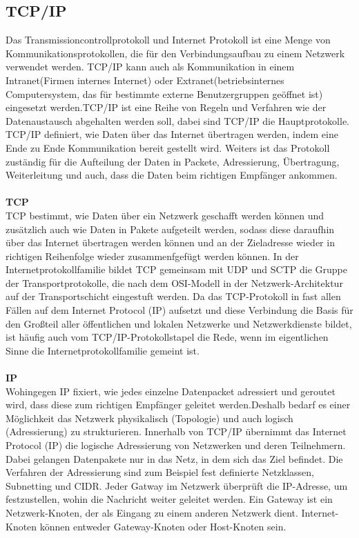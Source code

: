 \documentclass[a4paper,12pt]{article}
\begin{document}
\subsection{TCP/IP}
Das Transmissioncontrollprotokoll und Internet Protokoll ist eine Menge von Kommunikationsprotokollen, die für den Verbindungsaufbau zu einem Netzwerk verwendet werden. TCP/IP kann auch als Kommunikation in einem Intranet(Firmen internes Internet) oder Extranet(betriebsinternes Computersystem, das für bestimmte externe Benutzergruppen geöffnet ist) eingesetzt werden.TCP/IP ist eine Reihe von Regeln und Verfahren wie der Datenaustausch abgehalten werden soll, dabei sind TCP/IP die Hauptprotokolle. TCP/IP definiert, wie Daten über das Internet übertragen werden, indem eine Ende zu Ende Kommunikation bereit gestellt wird. Weiters ist das Protokoll zuständig für die Aufteilung der Daten in Packete, Adressierung, Übertragung, Weiterleitung und auch, dass die Daten beim richtigen Empfänger ankommen.\\\\
\textbf{TCP}\\
TCP bestimmt, wie Daten über ein Netzwerk geschafft werden können und zusätzlich auch wie Daten in Pakete aufgeteilt werden, sodass diese daraufhin über das Internet übertragen werden können und an der Zieladresse wieder in richtigen Reihenfolge wieder zusammenfgefügt werden können.
In der Internetprotokollfamilie bildet TCP gemeinsam mit UDP und SCTP die Gruppe der Transportprotokolle, die nach dem OSI-Modell in der Netzwerk-Architektur auf der Transportschicht eingestuft werden. Da das TCP-Protokoll in fast allen Fällen auf dem Internet Protocol (IP) aufsetzt und diese Verbindung die Basis für den Großteil aller öffentlichen und lokalen Netzwerke und Netzwerkdienste bildet, ist häufig auch vom TCP/IP-Protokollstapel die Rede, wenn im eigentlichen Sinne die Internetprotokollfamilie gemeint ist.
\\\\
\textbf{IP}\\
Wohingegen IP fixiert, wie jedes einzelne Datenpacket adressiert und geroutet wird, dass diese zum richtigen Empfänger geleitet werden.Deshalb bedarf es einer Möglichkeit das Netzwerk physikalisch (Topologie) und auch logisch (Adressierung) zu strukturieren. Innerhalb von TCP/IP übernimmt das Internet Protocol (IP) die logische Adressierung von Netzwerken und deren Teilnehmern. Dabei gelangen Datenpakete nur in das Netz, in dem sich das Ziel befindet. Die Verfahren der Adressierung sind zum Beispiel fest definierte Netzklassen, Subnetting und CIDR. Jeder Gatway im Netzwerk überprüft die IP-Adresse, um festzustellen, wohin die Nachricht weiter geleitet werden. Ein Gateway ist ein Netzwerk-Knoten, der als Eingang zu einem anderen Netzwerk dient. Internet-Knoten können entweder Gateway-Knoten oder Host-Knoten sein.\\\\
\end{document}
